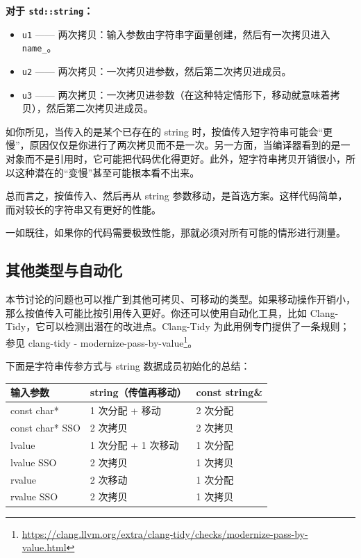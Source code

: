\textbf{对于 \texttt{std::string}：}

\begin{itemize}
\item \texttt{u1} —— 两次拷贝：输入参数由字符串字面量创建，然后有一次拷贝进入 \texttt{name\_}。
\item \texttt{u2} —— 两次拷贝：一次拷贝进参数，然后第二次拷贝进成员。
\item \texttt{u3} —— 两次拷贝：一次拷贝进参数（在这种特定情形下，移动就意味着拷贝），然后第二次拷贝进成员。
\end{itemize}

如你所见，当传入的是某个已存在的 string 时，按值传入短字符串可能会“更慢”，原因仅仅是你进行了两次拷贝而不是一次。另一方面，当编译器看到的是一对象而不是引用时，它可能把代码优化得更好。此外，短字符串拷贝开销很小，所以这种潜在的“变慢”甚至可能根本看不出来。

总而言之，按值传入、然后再从 string 参数移动，是首选方案。这样代码简单，而对较长的字符串又有更好的性能。

一如既往，如果你的代码需要极致性能，那就必须对所有可能的情形进行测量。

\subsection{其他类型与自动化}

\begin{myInfoBox}
本节讨论的问题也可以推广到其他可拷贝、可移动的类型。如果移动操作开销小，那么按值传入可能比按引用传入更好。你还可以使用自动化工具，比如 Clang-Tidy，它可以检测出潜在的改进点。Clang-Tidy 为此用例专门提供了一条规则；参见 clang-tidy - modernize-pass-by-value\footnote{\url{https://clang.llvm.org/extra/clang-tidy/checks/modernize-pass-by-value.html}}。
\end{myInfoBox}

下面是字符串传参方式与 string 数据成员初始化的总结：

\begin{center}
\begin{tabular}{lll}
\toprule
输入参数 & string（传值再移动） & const string\& \\
\midrule
const char* & 1 次分配 + 移动 & 2 次分配 \\
const char* SSO & 2 次拷贝 & 2 次拷贝 \\
lvalue & 1 次分配 + 1 次移动 & 1 次分配 \\
lvalue SSO & 2 次拷贝 & 1 次拷贝 \\
rvalue & 2 次移动 & 1 次分配 \\
rvalue SSO & 2 次拷贝 & 1 次拷贝 \\
\bottomrule
\end{tabular}
\end{center}

